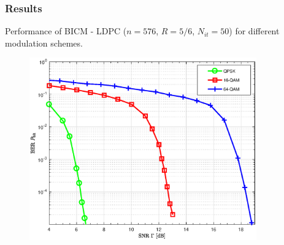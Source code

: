 \documentclass[]{beamer}
\begin{document}
\begin{frame}
\transwipe[direction=0]
\frametitle{Results}
Performance of BICM - LDPC ($n = 576$, $R = 5/6$, $N_{it} = 50$) for different modulation schemes.
\begin{center}
\begin{figure}
\includegraphics[width=9.8cm, trim={0 0 0 0.9cm},clip]{figure1/bicm}
\end{figure}
\end{center}

\end{frame}

\begin{frame}
\end{frame}
\end{document}
